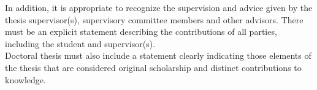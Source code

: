 \begin{prefatory}
\noindent
In addition, it is appropriate to recognize the supervision and advice
given by the thesis supervisor(s), supervisory committee members and
other advisors.
\contribution%
There must be an explicit statement describing the contributions of all
parties, including the student and supervisor(s).\\

\noindent
Doctoral thesis must also include a statement clearly indicating those
elements of the thesis that are considered original scholarship and
distinct contributions to knowledge.

\tableofcontents%
%
%
\end{prefatory}
%
